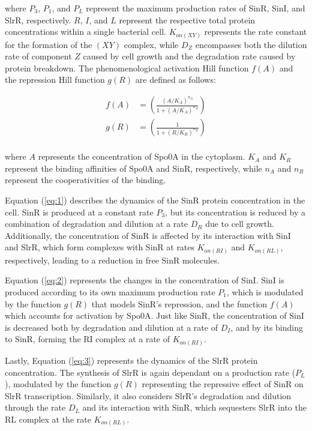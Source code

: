 where \(P_3\), \(P_1\), and \(P_L\) represent the maximum production rates of SinR, SinI, and SlrR, respectively. \(R\), \(I\), and \(L\) represent the respective total protein concentrations within a single bacterial cell. \(K_{on(XY)}\) represents the rate constant for the formation of the $(XY)$ complex, while \(D_Z\) encompasses both the dilution rate of component $Z$ caused by cell growth and the degradation rate caused by protein breakdown. The phenomenological activation Hill function \(f(A)\) and the repression Hill function \(g(R)\) are defined as follows:


\begin{align*}
    f(A) &= \left(\frac{(A/K_A)^{n_A}}{1 + (A/K_A)^{n_A}}\right) \\
    g(R) &= \left(\frac{1}{1 + (R/K_R)^{n_R}}\right) \\
\end{align*}  

where $A$ represents the concentration of Spo0A in the cytoplasm. \(K_{A}\) and \(K_R\) represent the binding affinities of Spo0A and SinR, respectively, while \(n_A\) and \(n_R\) represent the cooperativities of the binding.

Equation (\ref{eq:1}) describes the dynamics of the SinR protein concentration in the cell. SinR is produced at a constant rate $P_3$, but its concentration is reduced by a combination of degradation and dilution at a rate $D_R$ due to cell growth. Additionally, the concentration of SinR is affected by its interaction with SinI and SlrR, which form complexes with SinR at rates $K_{on(RI)}$ and $K_{on(RL)}$, respectively, leading to a reduction in free SinR molecules.

Equation (\ref{eq:2}) represents the changes in the concentration of SinI. SinI is produced according to its own maximum production rate $P_1$, which is modulated by the function $g(R)$ that models SinR's repression, and the function $f(A)$ which accounts for activation by Spo0A. Just like SinR, the concentration of SinI is decreased both by degradation and dilution at a rate of $D_I$, and by its binding to SinR, forming the RI complex at a rate of $K_{on(RI)}$.

Lastly, Equation (\ref{eq:3}) represents the dynamics of the SlrR protein concentration. The synthesis of SlrR is again dependant on a production rate ($P_L$), modulated by the function $g(R)$ representing the repressive effect of SinR on SlrR transcription. Similarly, it also considers SlrR's degradation and dilution through the rate $D_L$ and its interaction with SinR, which sequesters SlrR into the RL complex at the rate $K_{on(RL)}$.

